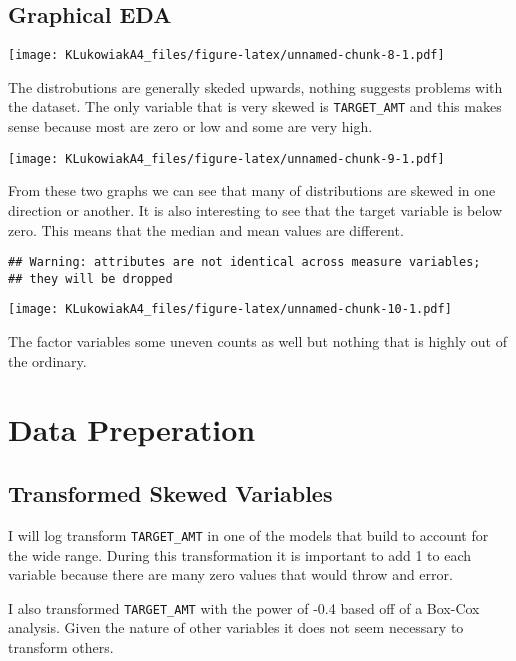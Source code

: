\documentclass[]{article}
\begin{document}
\hypertarget{graphical-eda}{%
\subsection{Graphical EDA}\label{graphical-eda}}

\texttt{[image: KLukowiakA4\_files/figure-latex/unnamed-chunk-8-1.pdf]}

The distrobutions are generally skeded upwards, nothing suggests
problems with the dataset. The only variable that is very skewed is
\texttt{TARGET\_AMT} and this makes sense because most are zero or low
and some are very high.

\texttt{[image: KLukowiakA4\_files/figure-latex/unnamed-chunk-9-1.pdf]}

From these two graphs we can see that many of distributions are skewed
in one direction or another. It is also interesting to see that the
target variable is below zero. This means that the median and mean
values are different.

\begin{verbatim}
## Warning: attributes are not identical across measure variables;
## they will be dropped
\end{verbatim}

\texttt{[image: KLukowiakA4\_files/figure-latex/unnamed-chunk-10-1.pdf]}

The factor variables some uneven counts as well but nothing that is
highly out of the ordinary.

\hypertarget{data-preperation}{%
\section{Data Preperation}\label{data-preperation}}

\hypertarget{transformed-skewed-variables}{%
\subsection{Transformed Skewed
Variables}\label{transformed-skewed-variables}}

I will log transform \texttt{TARGET\_AMT} in one of the models that
build to account for the wide range. During this transformation it is
important to add 1 to each variable because there are many zero values
that would throw and error.

I also transformed \texttt{TARGET\_AMT} with the power of -0.4 based off
of a Box-Cox analysis. Given the nature of other variables it does not
seem necessary to transform others.
\end{document}
